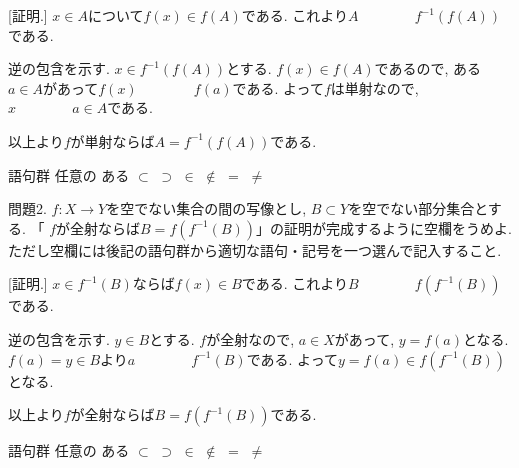 \documentclass[dvipdfmx,a4paper,11pt]{article}
\theoremstyle{definition}
\begin{document}
[証明.] $x \in A$について$f(x) \in f(A)$である. これより$A \boxed{\phantom{hogehoge}} f^{-1}(f(A))$である.

逆の包含を示す.
$x \in f^{-1}(f(A))$とする. 
$f(x) \in f(A)$であるので, ある$a \in A$があって$f(x) \boxed{\phantom{hogehoge}} f(a)$である.
よって$f$は単射なので, $x \boxed{\phantom{hogehoge}} a \in A$である. 

以上より$f$が単射ならば$A=f^{-1}(f(A))$である.


\begin{itembox}[l]{語句群}
任意の \quad ある \quad $\subset$ \quad $\supset$
\quad $\in$ \quad $\not\in$ \quad $=$ \quad $\neq$　
\end{itembox}

\medskip
 問題2. $f : X \to Y$を空でない集合の間の写像とし, $B \subset Y$を空でない部分集合とする.
 「 $f$が全射ならば$B=f(f^{-1}(B))$」の証明が完成するように空欄をうめよ. 
ただし空欄には後記の語句群から適切な語句・記号を一つ選んで記入すること.

[証明.] $x \in f^{-1}(B)$ならば$f(x) \in B$である. これより$B \boxed{\phantom{hogehoge}}f(f^{-1}(B))$である. 

逆の包含を示す.
$y \in B$とする. 
$f$が全射なので, \boxed{\phantom{hogehoge}}$a \in X$があって, $y = f(a)$となる. 
$f(a)=y \in B$より$a \boxed{\phantom{hogehoge}}  f^{-1}(B)$である.
よって$y = f(a) \in f(f^{-1}(B))$となる. 

以上より$f$が全射ならば$B=f(f^{-1}(B))$である.

\begin{itembox}[l]{語句群}
任意の \quad ある \quad \quad $\subset$ \quad $\supset$
\quad $\in$ \quad $\not\in$ \quad $=$ \quad $\neq$　
\end{itembox}
\end{document}
